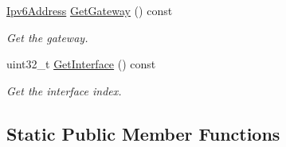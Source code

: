 \begin{DoxyCompactItemize}
\hyperlink{classns3_1_1Ipv6Address}{Ipv6\+Address} \hyperlink{classns3_1_1Ipv6RoutingTableEntry_aa697dd576f734b783261ebb4d6f1a000}{Get\+Gateway} () const 
\begin{DoxyCompactList}\small\item\em Get the gateway. \end{DoxyCompactList}\item 
uint32\+\_\+t \hyperlink{classns3_1_1Ipv6RoutingTableEntry_ac0af24faeeb9efead20dbfd24c3d29d9}{Get\+Interface} () const 
\begin{DoxyCompactList}\small\item\em Get the interface index. \end{DoxyCompactList}\end{DoxyCompactItemize}
\subsection*{Static Public Member Functions}
